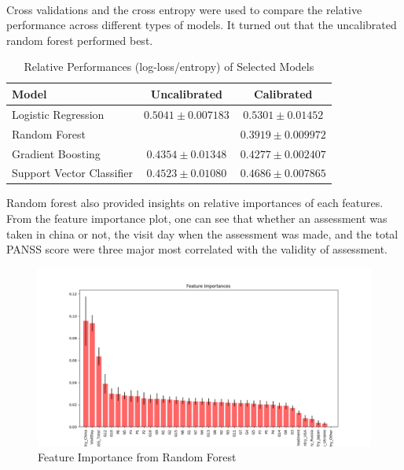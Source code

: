 \documentclass[11pt]{article}
\begin{document}
 	\paragraph{} Cross validations and the cross entropy were used to compare the relative performance across different types of models. It turned out that the uncalibrated random forest performed best.
 	
 	\begin{table}[H]
 		\centering
 		\begin{tabular}{l|c|c}
 			Model & Uncalibrated & Calibrated \\
 			\hline 
 			Logistic Regression & $0.5041 \pm 0.007183$ & $0.5301 \pm 0.01452$\\
 			Random Forest & \red{$0.3689 \pm 0.008212$} & $0.3919 \pm 0.009972$\\
 			Gradient Boosting & $0.4354 \pm 0.01348$ & $0.4277 \pm 0.002407$\\
 			Support Vector Classifier & $0.4523 \pm 0.01080$ & $0.4686 \pm 0.007865$ \\
 		\end{tabular}
 		\caption{Relative Performances (log-loss/entropy) of Selected Models}
 	\end{table}
 	
 	Random forest also provided insights on relative importances of each features. From the feature importance plot, one can see that whether an assessment was taken in china or not, the visit day when the assessment was made, and the total PANSS score were three major most correlated with the validity of assessment.
 	\begin{figure}[H]
 		\centering
 		\includegraphics[width=0.9\linewidth]{figures/classification_feature_importance.png}
 		\caption{Feature Importance from Random Forest}
 	\end{figure}
 	
\end{document}
